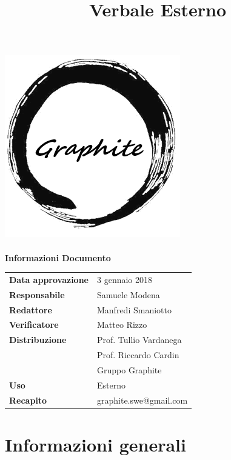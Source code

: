 \documentclass[openany,12pt,a4paper]{article}
\title{Verbale Esterno}
\author{}
\begin{document}
 
  \makeatletter 
  \begin{titlepage} 
    \setlength{\headsep}{0pt}   
    \begin{center} 
      \includegraphics[width=0.5\linewidth]{Logo.png}\\[1em] 
      {\huge \bfseries  \@title }\\[10ex] 
      \textbf{\Large Informazioni Documento} \\[2em] 
      \bgroup 
      \def\arraystretch{1.5} 
      \begin{tabular}{l|l} 
        \textbf{Data approvazione} & 3 gennaio 2018 \\ 
        \textbf{Responsabile} & Samuele Modena \\ 
        \textbf{Redattore} & Manfredi Smaniotto \\ 
        \textbf{Verificatore} & Matteo Rizzo \\ 
        \textbf{Distribuzione} & Prof. Tullio Vardanega \\ 
         & Prof. Riccardo Cardin \\ 
         & Gruppo Graphite \\ 
        \textbf{Uso} & Esterno \\ 
        \textbf{Recapito} & graphite.swe@gmail.com \\ 
      \end{tabular} 
    \egroup 
    \end{center} 
  \end{titlepage} 
  \makeatother 
 
  \thispagestyle{empty} 
  \newpage 
   
  \tableofcontents 
  \newpage 
   
  \section{Informazioni generali} 
   
\end{document}
